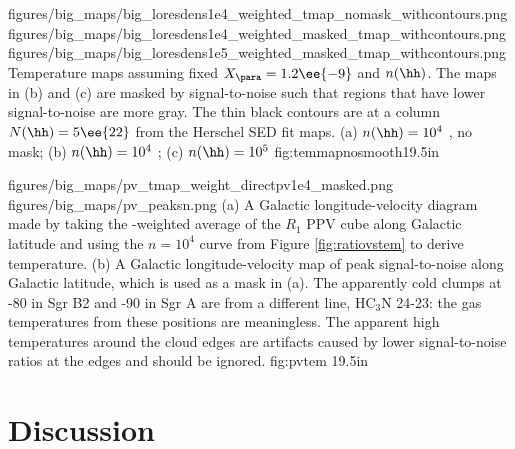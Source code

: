 \RotFigureThreeAA
{figures/big_maps/big_loresdens1e4_weighted_tmap_nomask_withcontours.png}
{figures/big_maps/big_loresdens1e4_weighted_masked_tmap_withcontours.png}
{figures/big_maps/big_loresdens1e5_weighted_masked_tmap_withcontours.png}
{Temperature maps assuming fixed $X_{\para}=1.2\ee{-9}$
and $n(\hh)$.  The maps in (b) and (c) are masked by signal-to-noise such that
regions that have lower signal-to-noise are more gray.  The thin black contours
are at a column $N(\hh)=5\ee{22}$ \persc
from the Herschel SED fit maps.
(a) $n(\hh) = 10^4$ \percc, no mask;
(b) $n(\hh) = 10^4$ \percc;
(c) $n(\hh) = 10^5$ \percc
}
{fig:temmapnosmooth}{1}{9.5in}





\RotFigureTwoAA
{figures/big_maps/pv_tmap_weight_directpv1e4_masked.png}
{figures/big_maps/pv_peaksn.png}
{(a) A Galactic longitude-velocity diagram made by taking the
\threeohthree-weighted average of the $R_1$ PPV cube along Galactic latitude
and using the $n=10^4$ \percc curve
from Figure \ref{fig:ratiovstem} to derive temperature.  (b) A Galactic
longitude-velocity map of peak signal-to-noise along Galactic latitude, which
is used as a mask in (a).  The apparently cold clumps at -80 \kms in Sgr B2 and
-90 \kms in Sgr A are from a different line, HC$_3$N 24-23: the gas
temperatures from these positions are meaningless.  The apparent high
temperatures around the cloud edges are artifacts caused by lower
signal-to-noise ratios at the edges and should be ignored.
}
{fig:pvtem}
{1}{9.5in}



\clearpage
\section{Discussion}
\label{sec:discussion}
